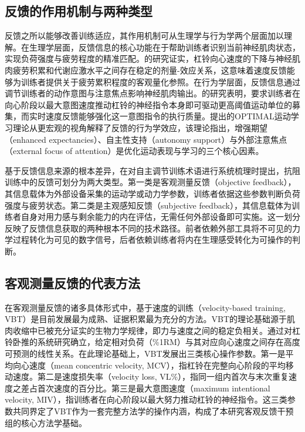 \subsection{反馈的作用机制与两种类型}

反馈之所以能够改善训练适应，其作用机制可从生理学与行为学两个层面加以理解。在生理学层面，反馈信息的核心功能在于帮助训练者识别当前神经肌肉状态，实现负荷强度与疲劳程度的精准匹配。\citep{GonzalezBadillo2011}的研究证实，杠铃向心速度的下降与神经肌肉疲劳积累和代谢应激水平之间存在稳定的剂量-效应关系，这意味着速度反馈能够为训练者提供关于疲劳累积程度的客观量化参照。在行为学层面，反馈信息通过调节训练者的动作意图与注意焦点影响神经肌肉输出。\citep{GonzalezBadillo2014}的研究表明，要求训练者在向心阶段以最大意图速度推动杠铃的神经指令本身即可驱动更高阈值运动单位的募集，而实时速度反馈能够强化这一意图指令的执行质量。\citep{Wulf2016}提出的OPTIMAL运动学习理论从更宏观的视角解释了反馈的行为学效应，该理论指出，增强期望（enhanced expectancies）、自主性支持（autonomy support）与外部注意焦点（external focus of attention）是优化运动表现与学习的三个核心因素。

基于反馈信息来源的根本差异，\citep{Greig2020}在对自主调节训练术语进行系统梳理时提出，抗阻训练中的反馈可划分为两大类型。第一类是客观测量反馈（objective feedback），其信息载体为外部设备采集的运动学或动力学参数，训练者依据这些参数判断负荷强度与疲劳状态。第二类是主观感知反馈（subjective feedback），其信息载体为训练者自身对用力感与剩余能力的内在评估，无需任何外部设备即可实施。这一划分反映了反馈信息获取的两种根本不同的技术路径。前者依赖外部工具将不可见的力学过程转化为可见的数字信号，后者依赖训练者将内在生理感受转化为可操作的判断。

\subsection{客观测量反馈的代表方法}

在客观测量反馈的诸多具体形式中，基于速度的训练（velocity-based training, VBT）是目前发展最为成熟、证据积累最为充分的方法。VBT的理论基础源于肌肉收缩中已被充分证实的生物力学规律，即力与速度之间的稳定负相关。\citep{GonzalezBadillo2010}通过对杠铃卧推的系统研究确立，给定相对负荷（\%1RM）与其对应向心速度之间存在高度可预测的线性关系。在此理论基础上，VBT发展出三类核心操作参数。第一是平均向心速度（mean concentric velocity, MCV），指杠铃在完整向心阶段的平均移动速度。第二是速度损失率（velocity loss, VL\%），指同一组内首次与末次重复速度之差占首次速度的百分比。第三是最大意图速度（maximum intentional velocity, MIV），指训练者在向心阶段以最大努力推动杠铃的神经指令。这三类参数共同界定了VBT作为一套完整方法学的操作内涵，构成了本研究客观反馈干预组的核心方法学基础。

